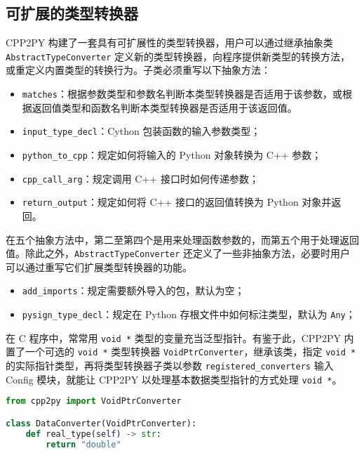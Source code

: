 \subsection{可扩展的类型转换器}

CPP2PY 构建了一套具有可扩展性的类型转换器，用户可以通过继承抽象类 \lstinline{AbstractTypeConverter} 定义新的类型转换器，向程序提供新类型的转换方法，或重定义内置类型的转换行为。子类必须重写以下抽象方法：

\begin{itemize}
    \item \lstinline{matches}：根据参数类型和参数名判断本类型转换器是否适用于该参数，或根据返回值类型和函数名判断本类型转换器是否适用于该返回值。
    \item \lstinline{input_type_decl}：Cython 包装函数的输入参数类型；
    \item \lstinline{python_to_cpp}：规定如何将输入的 Python 对象转换为 C++ 参数；
    \item \lstinline{cpp_call_arg}：规定调用 C++ 接口时如何传递参数；
    \item \lstinline{return_output}：规定如何将 C++ 接口的返回值转换为 Python 对象并返回。
\end{itemize}


在五个抽象方法中，第二至第四个是用来处理函数参数的，而第五个用于处理返回值。除此之外，\lstinline{AbstractTypeConverter} 还定义了一些非抽象方法，必要时用户可以通过重写它们扩展类型转换器的功能。

\begin{itemize}
    \item \lstinline{add_imports}：规定需要额外导入的包，默认为空；
    \item \lstinline{pysign_type_decl}：规定在 Python 存根文件中如何标注类型，默认为 \lstinline{Any}；
\end{itemize}

在 C 程序中，常常用 \lstinline{void *} 类型的变量充当泛型指针。有鉴于此，CPP2PY 内置了一个可选的 \lstinline{void *} 类型转换器 \lstinline{VoidPtrConverter}，继承该类，指定 \lstinline{void *} 的实际指针类型，再将类型转换器子类以参数 \lstinline{registered_converters} 输入 Config 模块，就能让 CPP2PY 以处理基本数据类型指针的方式处理 \lstinline{void *}。

\begin{framed}
\begin{lstlisting}[language=python]
from cpp2py import VoidPtrConverter

class DataConverter(VoidPtrConverter):
    def real_type(self) -> str:
        return "double"
\end{lstlisting}
\end{framed}

